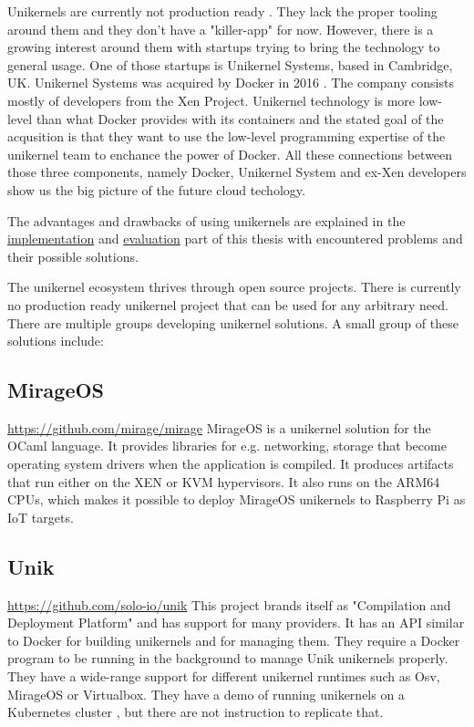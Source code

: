 Unikernels are currently not production ready \cite{unfit-for-production}. They lack the proper tooling around them and they don't have a "killer-app" for now. However, there is a growing interest around them with startups trying to bring the technology to general usage. One of those startups is Unikernel Systems, based in Cambridge, UK. Unikernel Systems was acquired by Docker in 2016 \cite{docker-acquisiton}. The company consists mostly of developers from the Xen Project. Unikernel technology is more low-level than what Docker provides with its containers and the stated goal of the acqusition is that they want to use the low-level programming expertise of the unikernel team to enchance the power of Docker. All these connections between those three components, namely Docker, Unikernel System and ex-Xen developers show us the big picture of the future cloud techology.

The advantages and drawbacks of using unikernels are explained in the \hyperref[chapter:implementation]{implementation} and \hyperref[chapter:evaluation]{evaluation} part of this thesis with encountered problems and their possible solutions.

The unikernel ecosystem thrives through open source projects. There is currently no production ready unikernel project that can be used for any arbitrary need. There are multiple groups developing unikernel solutions. A small group of these solutions include:
\subsection*{MirageOS}

\url{https://github.com/mirage/mirage} \cite{madhavapeddy2014unikernels}
  MirageOS is a unikernel solution for the OCaml language. It provides libraries for e.g. networking, storage that become operating system drivers when the application is compiled. It produces artifacts that run either on the XEN or KVM hypervisors. It also runs on the ARM64 CPUs, which makes it possible to deploy MirageOS unikernels to Raspberry Pi as IoT targets.
\subsection*{Unik}
\url{https://github.com/solo-io/unik} \cite{levine2016unik} This project brands itself as "Compilation and Deployment Platform" and has support for many providers. It has an API similar to Docker for building unikernels and for managing them. They require a Docker program to be running in the background to manage Unik unikernels properly. They have a wide-range support for different unikernel runtimes such as Osv, MirageOS or Virtualbox. They have a demo of running unikernels on a Kubernetes cluster \cite{unik-youtube}, but there are not instruction to replicate that.
